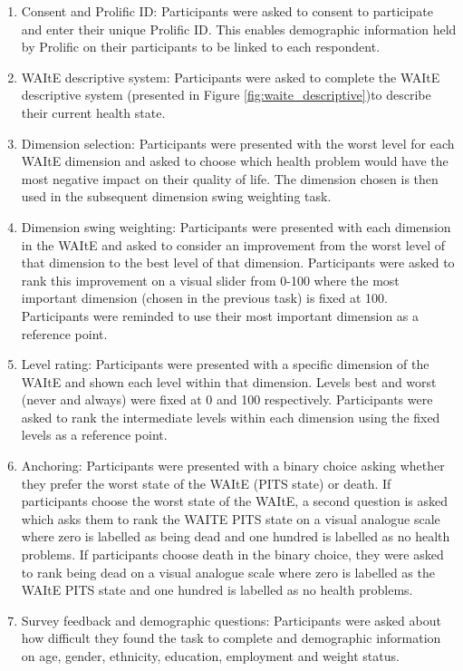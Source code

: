 \documentclass[
  number,
  preprint]{elsarticle}
\providecommand{\tightlist}{%
  \setlength{\itemsep}{0pt}\setlength{\parskip}{0pt}}\usepackage{longtable,booktabs,array}
\begin{document}
\begin{enumerate}
\def\labelenumi{\arabic{enumi}.}
\tightlist
\item
  Consent and Prolific ID: Participants were asked to consent to
  participate and enter their unique Prolific ID. This enables
  demographic information held by Prolific on their participants to be
  linked to each respondent.
\item
  WAItE descriptive system: Participants were asked to complete the
  WAItE descriptive system (presented in Figure
  \ref{fig:waite_descriptive})to describe their current health state.
\item
  Dimension selection: Participants were presented with the worst level
  for each WAItE dimension and asked to choose which health problem
  would have the most negative impact on their quality of life. The
  dimension chosen is then used in the subsequent dimension swing
  weighting task.\\
\item
  Dimension swing weighting: Participants were presented with each
  dimension in the WAItE and asked to consider an improvement from the
  worst level of that dimension to the best level of that dimension.
  Participants were asked to rank this improvement on a visual slider
  from 0-100 where the most important dimension (chosen in the previous
  task) is fixed at 100. Participants were reminded to use their most
  important dimension as a reference point.\\
\item
  Level rating: Participants were presented with a specific dimension of
  the WAItE and shown each level within that dimension. Levels best and
  worst (never and always) were fixed at 0 and 100 respectively.
  Participants were asked to rank the intermediate levels within each
  dimension using the fixed levels as a reference point.
\item
  Anchoring: Participants were presented with a binary choice asking
  whether they prefer the worst state of the WAItE (PITS state) or
  death. If participants choose the worst state of the WAItE, a second
  question is asked which asks them to rank the WAITE PITS state on a
  visual analogue scale where zero is labelled as being dead and one
  hundred is labelled as no health problems. If participants choose
  death in the binary choice, they were asked to rank being dead on a
  visual analogue scale where zero is labelled as the WAItE PITS state
  and one hundred is labelled as no health problems.
\item
  Survey feedback and demographic questions: Participants were asked
  about how difficult they found the task to complete and demographic
  information on age, gender, ethnicity, education, employment and
  weight status.
\end{enumerate}
\end{document}
